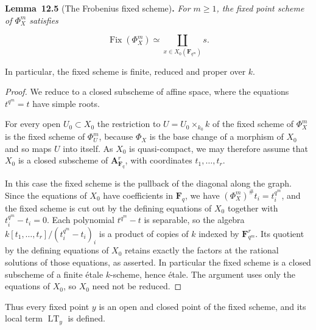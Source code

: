 \documentclass[11pt]{article}
\newenvironment{bpstatement}[2]{\par\addvspace{0.6\baselineskip}\noindent\textbf{#1}#2\textbf{.}\enspace\ignorespaces}
  {\par\addvspace{0.4\baselineskip}}
\newenvironment{bpstatementit}[2]{\begin{bpstatement}{#1}{#2}\itshape\ignorespaces}{\end{bpstatement}}
\providecommand{\Fix}{}\renewcommand{\Fix}{\operatorname{Fix}}
\begin{document}
\label{bp15}%
\begin{bpstatementit}{Lemma~12.5}{ (The Frobenius fixed scheme)}
For \(m\geq1\), the fixed point scheme of \(\Phi_X^m\) satisfies

\[
\Fix(\Phi_X^m)
\simeq\coprod_{x\in X_0(\mathbf F_{q^m})}s.
\]

In particular, the fixed scheme is finite, reduced and proper over \(k\).
\end{bpstatementit}

\begin{proof}[{Proof}]\label{bp16}%
We reduce to a closed subscheme of affine space, where the equations \(t^{q^m}=t\) have simple roots.

For every open \(U_0\subset X_0\) the restriction to \(U=U_0\times_{k_0}k\) of the fixed scheme of \(\Phi_X^m\) is the fixed scheme of \(\Phi_U^m\), because \(\Phi_X\) is the base change of a morphism of \(X_0\) and so maps \(U\) into itself. As \(X_0\) is quasi-compact, we may therefore assume that \(X_0\) is a closed subscheme of \(\mathbf A^r_{\mathbf F_q}\), with coordinates \(t_1,\ldots,t_r\).

In this case the fixed scheme is the pullback of the diagonal along the graph. Since the equations of \(X_0\) have coefficients in \(\mathbf F_q\), we have \((\Phi_X^m)^\#t_i=t_i^{q^m}\), and the fixed scheme is cut out by the defining equations of \(X_0\) together with \(t_i^{q^m}-t_i=0\). Each polynomial \(t^{q^m}-t\) is separable, so the algebra \(k[t_1,\ldots,t_r]/(t_i^{q^m}-t_i)_i\) is a product of copies of \(k\) indexed by \(\mathbf F_{q^m}^r\). Its quotient by the defining equations of \(X_0\) retains exactly the factors at the rational solutions of those equations, as asserted. In particular the fixed scheme is a closed subscheme of a finite étale \(k\)-scheme, hence étale. The argument uses only the equations of \(X_0\), so \(X_0\) need not be reduced.
\end{proof}

\label{bp17}%
Thus every fixed point \(y\) is an open and closed point of the fixed scheme, and its local term \(\operatorname{LT}_y\) is defined.
\end{document}
